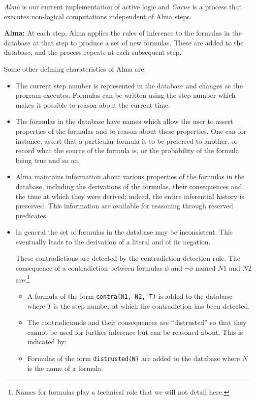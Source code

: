 {\em Alma} is our current implementation of active logic and {\em Carne} is
a process that executes non-logical computations independent of Alma
steps. 

{\bf Alma:}
At each step, Alma applies the
rules of inference to the formulas in the database at that
step to produce a set of new formulas. These are added to the database,
and the process repeats at each subsequent step.

Some other defining charateristics of Alma are:
\begin{itemize}

\item
The current step number is represented in the database and changes as
the program executes. Formulas can  be written using the step number
which makes it possible to reason about the current time.

\item
The formulas in the database have names which allow the user to
assert properties of the formulas and to reason about these properties. 
One can for instance, assert that a particular formula is
to be preferred to another, or record what the source of the formula
is, or the probability of the formula being true and so on.

\item
Alma maintains information about various properties of the
formulas in the database, including the derivations of the formulas,
their consequences and the time at which they were derived; indeed,
the entire inferential history is preserved. This
information are available for reasoning through reserved predicates.

\item
In general the set of formulas in the database may be
inconsistent. This eventually leads to the derivation of a literal and
of its negation. 

These contradictions are detected by the contradiction-detection rule.
The consequence of a contradiction between formulas $\phi$ and $\neg
\phi$ named $N1$ and $N2$ are:\footnote
{
Names for formulas play a technical role that we will not detail here.
}

\begin{itemize}
\item A formula of the form \texttt{contra(N1, N2, T)} is added to the
database where $T$ is the step number at which the contradiction has
been detected.
\item The contradictands and their consequences are ``distrusted'' so
that they cannot be used for further inference but can be
reasoned about. This is indicated by:
\item Formulas of the form \texttt{distrusted(N)} are added to the
database where $N$ is the name of a formula.
\end{itemize}


\end{itemize}
